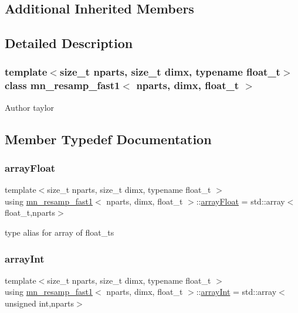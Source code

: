 \subsection*{Additional Inherited Members}


\subsection{Detailed Description}
\subsubsection*{template$<$size\+\_\+t nparts, size\+\_\+t dimx, typename float\+\_\+t$>$\newline
class mn\+\_\+resamp\+\_\+fast1$<$ nparts, dimx, float\+\_\+t $>$}

\begin{DoxyAuthor}{Author}
taylor 
\end{DoxyAuthor}


\subsection{Member Typedef Documentation}
\mbox{\label{classmn__resamp__fast1_a9c95e7078cc9709024031bac44b431d6}} 
\subsubsection{\texorpdfstring{array\+Float}{arrayFloat}}
{\footnotesize\ttfamily template$<$size\+\_\+t nparts, size\+\_\+t dimx, typename float\+\_\+t $>$ \\
using \hyperlink{classmn__resamp__fast1}{mn\+\_\+resamp\+\_\+fast1}$<$ nparts, dimx, float\+\_\+t $>$\+::\hyperlink{classrbase_a6f76bef853e508cb5b6f546d231b06f5}{array\+Float} =  std\+::array$<$float\+\_\+t,nparts$>$}

type alias for array of float\+\_\+ts \mbox{\label{classmn__resamp__fast1_a8bf919fd596ab39fccbe152f5a742022}} 
\subsubsection{\texorpdfstring{array\+Int}{arrayInt}}
{\footnotesize\ttfamily template$<$size\+\_\+t nparts, size\+\_\+t dimx, typename float\+\_\+t $>$ \\
using \hyperlink{classmn__resamp__fast1}{mn\+\_\+resamp\+\_\+fast1}$<$ nparts, dimx, float\+\_\+t $>$\+::\hyperlink{classmn__resamp__fast1_a8bf919fd596ab39fccbe152f5a742022}{array\+Int} =  std\+::array$<$unsigned int,nparts$>$}


